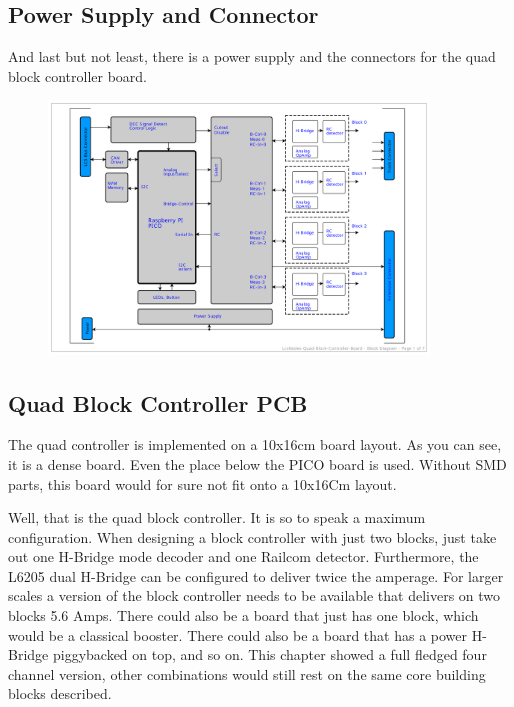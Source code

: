 \subsection{Power Supply and Connector}

And last but not least, there is a power supply and the connectors for the quad block controller board.

\begin{figure}[htbp]
    \centering
    \includegraphics[page=7, width=0.9\textwidth]{./Schematics/Schematic_LcsNodes-Quad-Block-Controller.pdf}
\end{figure}
\FloatBarrier

\subsection{Quad Block Controller PCB}

The quad controller is implemented on a 10x16cm board layout. As you can see, it is a dense board. Even the place below the PICO board is used. Without SMD parts, this board would for sure not fit onto a 10x16Cm layout.



Well, that is the quad block controller. It is so to speak a maximum configuration. When designing a block controller with just two blocks, just take out one H-Bridge mode decoder and one Railcom detector. Furthermore, the L6205 dual H-Bridge can be configured to deliver twice the amperage. For larger scales a version of the block controller needs to be available that delivers on two blocks 5.6 Amps. There could also be a board that just has one block, which would be a classical booster. There could also be a board that has a power H-Bridge piggybacked on top, and so on. This chapter showed a full fledged four channel version, other combinations would still rest on the same core building blocks described.


